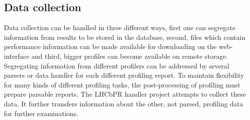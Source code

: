 \documentclass[a4paper]{jpconf}
\begin{document}
\subsection{Data collection}
\label{sec:data_collection}

Data collection can be handled in three different ways, first one can segregate information from results to be stored in the database, second, files which contain performance information can be made available for downloading on the web-interface and third, bigger profiles can become available on remote storage. Segregating information from different profilers can be addressed by several parsers or data handler for each different profiling report. To maintain flexibility for many kinds of different profiling tasks, the post-processing of profiling must prepare parsable reports. The LHCbPR handler project attempts to collect these data. It further transfers information about the other, not parsed, profiling data for further examinations.
\end{document}
